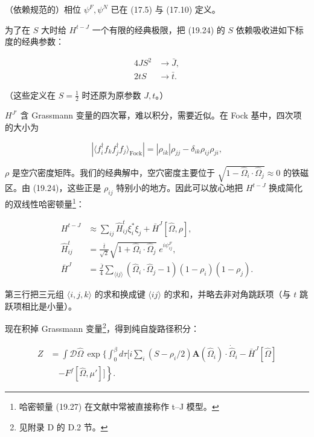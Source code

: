 （依赖规范的）相位 $\psi^F, \psi^N$ 已在 (17.5) 与 (17.10) 定义。

为了在 $S$ 大时给 $H^{t-J}$ 一个有限的经典极限，把 (19.24) 的 $S$ 依赖吸收进如下标度的经典参数：

\begin{align*}
4JS ^ {2} & \to \bar {J} ,\\
2tS & \to \bar {t} .
\tag{19.25}
\end{align*}

（这些定义在 $S = \frac{1}{2}$ 时还原为原参数 $J, t$。）

$H^{J'}$ 含 Grassmann 变量的四次幂，难以积分，需要近似。在 Fock 基中，四次项的大小为

\begin{equation*}
\left| \langle f _ {i} ^ {\dagger} f _ {k} f _ {j} ^ {\dagger} f _ {j} \rangle_{\mathrm{Fock}} \right| = \left| \rho_{ik} \right| \rho_{jj} - \delta_{ik} \rho_{ij} \rho_{ji} ,
\tag{19.26}
\end{equation*}

$\rho$ 是空穴密度矩阵。我们的经典解中，空穴密度主要位于 $\sqrt{1-\hat{\Omega}_{i}\cdot\hat{\Omega}_{j}}\approx0$ 的铁磁区。由 (19.24)，这些正是 $\rho_{ij}$ 特别小的地方。因此可以放心地把 $H^{t-J}$ 换成简化的双线性哈密顿量\footnote{哈密顿量 (19.27) 在文献中常被直接称作 t--J 模型。}：

\begin{align*}
H ^ {t - J} & \approx \sum_ {ij} \hat {H}_{ij} ^ {t} \xi_{i} ^ {*} \xi_{j} + \bar {H} ^ {J} [ \hat {\Omega}, \rho ] ,\\
\hat {H} _ {ij} ^ {t} & = \frac {\bar {t}}{\sqrt {2}} \sqrt {1 + \hat {\Omega} _ {i} \cdot \hat {\Omega} _ {j}} \; e ^ {i \psi_{ij} ^ {F}} ,\\
\bar {H} ^ {J} & = \frac {\bar {J}}{4} \sum_{\langle ij \rangle} \left( \hat {\Omega} _ {i} \cdot \hat {\Omega} _ {j} - 1 \right) \left( 1 - \rho_{i} \right) \left( 1 - \rho_{j} \right) .
\tag{19.27}
\end{align*}

第三行把三元组 $\langle i,j,k\rangle$ 的求和换成键 $\langle ij\rangle$ 的求和，并略去非对角跳跃项（与 $t$ 跳跃项相比是小量）。

现在积掉 Grassmann 变量\footnote{见附录 D 的 D.2 节。}，得到纯自旋路径积分：

\begin{align*}
Z & = \int \mathcal {D} \hat {\Omega} \, \exp \Big\{ \int_ {0} ^ {\beta} d \tau \Big[ i \sum_ {i} \left( S - \rho_{i} /2 \right) \mathbf {A} ( \hat {\Omega} _ {i} ) \cdot \dot {\hat {\Omega}} _ {i} - \bar {H} ^ {J} [ \hat {\Omega} ]\\
& \quad \left. - F ^ {f} [ \hat {\Omega}, \mu ' ] \Big] \right\} .
\tag{19.28}
\end{align*}


